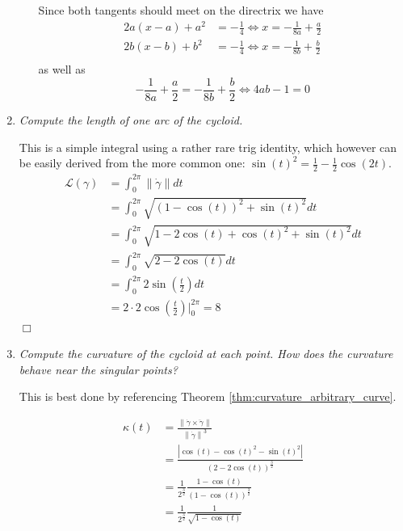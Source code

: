 \documentclass[a4paper,11pt,notitlepage,fullpage]{paper}
\newcommand{\dy}{\dot\gamma}
\newcommand{\ddy}{\ddot\gamma}
\theoremstyle{plain}
\theoremstyle{definition}
\begin{document}
\begin{enumerate}
\begin{enumerate}
Since both tangents should meet on the directrix we have
\begin{align*}
	2a(x-a)+a^2&=-\frac{1}{4} \Leftrightarrow x=-\frac{1}{8a}+\frac{a}{2} \\
	2b(x-b)+b^2&=-\frac{1}{4} \Leftrightarrow x=-\frac{1}{8b}+\frac{b}{2}\\
\end{align*}
as well as
\begin{equation*}
	-\frac{1}{8a}+\frac{a}{2} = -\frac{1}{8b}+\frac{b}{2} \Leftrightarrow 4ab-1=0
\end{equation*}
\end{enumerate}

\item \emph{Compute the length of one arc of the cycloid.}

This is a simple integral using a rather rare trig identity, which however can be easily derived from the more common one: $\sin(t)^2 = \frac{1}{2} - \frac{1}{2}\cos(2t)$.
\begin{align*}
\mathcal L(\gamma) &= \int_0^{2\pi} \left\| \dot\gamma \right\| dt \\
&= \int_0^{2\pi} \sqrt{(1-\cos(t))^2 + \sin(t)^2} dt \\
&= \int_0^{2\pi} \sqrt{1 - 2\cos(t) + \cos(t)^2 + \sin(t)^2} dt \\
&= \int_0^{2\pi} \sqrt{2 - 2\cos(t)} dt \\
&= \int_0^{2\pi} 2 \sin\left(\frac{t}{2}\right) dt \\
&= 2 \cdot 2 \cos\left(\frac{t}{2}\right)\Bigg|_0^{2\pi} = 8
\end{align*}
\hfill $\Box$

\item \emph{Compute the curvature of the cycloid at each point. How does the curvature behave near the singular points?}

This is best done by referencing Theorem \ref{thm:curvature_arbitrary_curve}.

\begin{align*}
\kappa(t) &= \frac{\left\|\dy \times \ddy\right\|}{\left\|\dy\right\|^3} \\
&= \frac{|\cos(t) - \cos(t)^2 - \sin(t)^2|}{(2 - 2\cos(t))^{\frac{3}{2}}} \\
&= \frac{1}{2^{\frac{3}{2}}} \frac{1 - \cos(t)}{(1 - \cos(t))^{\frac{3}{2}}} \\
&= \frac{1}{2^{\frac{3}{2}}} \frac{1}{\sqrt{1 - \cos(t)}}
\end{align*}


\end{enumerate}
\end{document}
